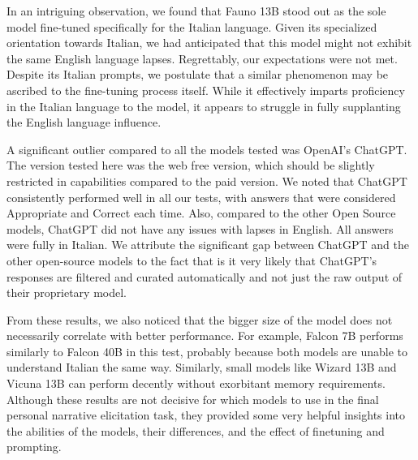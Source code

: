 In an intriguing observation, we found that Fauno 13B \cite{fauno} stood out as the sole model fine-tuned specifically for the Italian language. Given its specialized orientation towards Italian, we had anticipated that this model might not exhibit the same English language lapses. Regrettably, our expectations were not met. Despite its Italian prompts, we postulate that a similar phenomenon may be ascribed to the fine-tuning process itself. While it effectively imparts proficiency in the Italian language to the model, it appears to struggle in fully supplanting the English language influence.

A significant outlier compared to all the models tested was OpenAI's ChatGPT. The version tested here was the web free version, which should be slightly restricted in capabilities compared to the paid version. We noted that ChatGPT consistently performed well in all our tests, with answers that were considered Appropriate and Correct each time. Also, compared to the other Open Source models, ChatGPT did not have any issues with lapses in English. All answers were fully in Italian. We attribute the significant gap between ChatGPT and the other open-source models to the fact that is it very likely that ChatGPT's responses are filtered and curated automatically and not just the raw output of their proprietary model.

From these results, we also noticed that the bigger size of the model does not necessarily correlate with better performance. For example, Falcon 7B performs similarly to Falcon 40B in this test, probably because both models are unable to understand Italian the same way. Similarly, small models like Wizard 13B and Vicuna 13B can perform decently without exorbitant memory requirements. Although these results are not decisive for which models to use in the final personal narrative elicitation task, they provided some very helpful insights into the abilities of the models, their differences, and the effect of finetuning and prompting.
